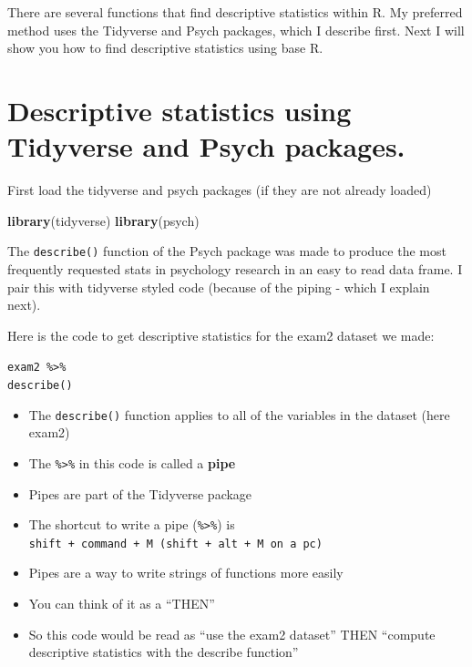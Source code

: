 \documentclass[
]{book}
\newenvironment{Shaded}{\begin{snugshade}}{\end{snugshade}}
\newcommand{\KeywordTok}[1]{\textcolor[rgb]{0.13,0.29,0.53}{\textbf{#1}}}
\newcommand{\NormalTok}[1]{#1}
\providecommand{\tightlist}{%
  \setlength{\itemsep}{0pt}\setlength{\parskip}{0pt}}
\begin{document}
There are several functions that find descriptive statistics within R. My preferred method uses the Tidyverse and Psych packages, which I describe first. Next I will show you how to find descriptive statistics using base R.

\hypertarget{descriptive-statistics-using-tidyverse-and-psych-packages.}{%
\section{Descriptive statistics using Tidyverse and Psych packages.}\label{descriptive-statistics-using-tidyverse-and-psych-packages.}}

First load the tidyverse and psych packages (if they are not already loaded)

\begin{Shaded}
\begin{Highlighting}[]
\KeywordTok{library}\NormalTok{(tidyverse)}
\KeywordTok{library}\NormalTok{(psych)}
\end{Highlighting}
\end{Shaded}

The \texttt{describe()} function of the Psych package was made to produce the most frequently requested stats in psychology research in an easy to read data frame. I pair this with tidyverse styled code (because of the piping - which I explain next).

Here is the code to get descriptive statistics for the exam2 dataset we made:

\texttt{exam2\ \%\textgreater{}\%}\\
\texttt{describe()}

\begin{itemize}
\tightlist
\item
  The \texttt{describe()} function applies to all of the variables in the dataset (here exam2)
\item
  The \texttt{\%\textgreater{}\%} in this code is called a \textbf{pipe}
\item
  Pipes are part of the Tidyverse package
\item
  The shortcut to write a pipe (\texttt{\%\textgreater{}\%}) is \texttt{shift\ +\ command\ +\ M\ (shift\ +\ alt\ +\ M\ on\ a\ pc)}
\item
  Pipes are a way to write strings of functions more easily
\item
  You can think of it as a ``THEN''
\item
  So this code would be read as ``use the exam2 dataset'' THEN ``compute descriptive statistics with the describe function''
\end{itemize}
\end{document}
